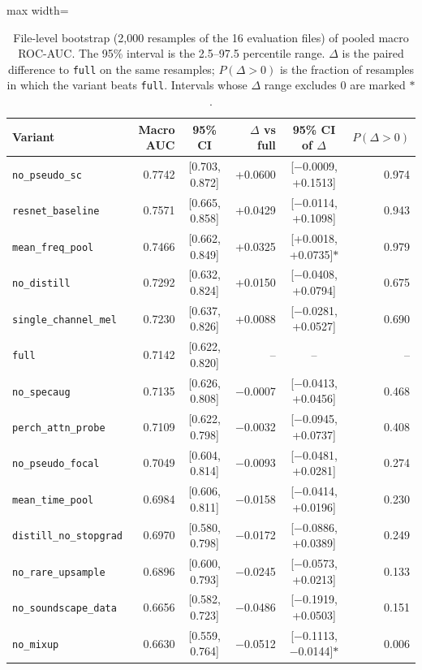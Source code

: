 \begin{table}[H]\centering\small
\caption{File-level bootstrap (2{,}000 resamples of the 16 evaluation files) of pooled macro ROC-AUC. The 95\% interval is the 2.5--97.5 percentile range. $\Delta$ is the paired difference to \texttt{full} on the same resamples; $P(\Delta>0)$ is the fraction of resamples in which the variant beats \texttt{full}. Intervals whose $\Delta$ range excludes 0 are marked $\ast$.}
\label{tab:boot}
\begin{adjustbox}{max width=\linewidth}
\begin{tabular}{lrcrcr}
\toprule
Variant & Macro AUC & 95\% CI & $\Delta$ vs full & 95\% CI of $\Delta$ & $P(\Delta>0)$ \\
\midrule
\texttt{no\_pseudo\_sc} & 0.7742 & [0.703, 0.872] & +0.0600 & [$-$0.0009, +0.1513] & 0.974 \\
\texttt{resnet\_baseline} & 0.7571 & [0.665, 0.858] & +0.0429 & [$-$0.0114, +0.1098] & 0.943 \\
\texttt{mean\_freq\_pool} & 0.7466 & [0.662, 0.849] & +0.0325 & [+0.0018, +0.0735]$\ast$ & 0.979 \\
\texttt{no\_distill} & 0.7292 & [0.632, 0.824] & +0.0150 & [$-$0.0408, +0.0794] & 0.675 \\
\texttt{single\_channel\_mel} & 0.7230 & [0.637, 0.826] & +0.0088 & [$-$0.0281, +0.0527] & 0.690 \\
\texttt{full} & 0.7142 & [0.622, 0.820] & -- & -- & -- \\
\texttt{no\_specaug} & 0.7135 & [0.626, 0.808] & $-$0.0007 & [$-$0.0413, +0.0456] & 0.468 \\
\texttt{perch\_attn\_probe} & 0.7109 & [0.622, 0.798] & $-$0.0032 & [$-$0.0945, +0.0737] & 0.408 \\
\texttt{no\_pseudo\_focal} & 0.7049 & [0.604, 0.814] & $-$0.0093 & [$-$0.0481, +0.0281] & 0.274 \\
\texttt{mean\_time\_pool} & 0.6984 & [0.606, 0.811] & $-$0.0158 & [$-$0.0414, +0.0196] & 0.230 \\
\texttt{distill\_no\_stopgrad} & 0.6970 & [0.580, 0.798] & $-$0.0172 & [$-$0.0886, +0.0389] & 0.249 \\
\texttt{no\_rare\_upsample} & 0.6896 & [0.600, 0.793] & $-$0.0245 & [$-$0.0573, +0.0213] & 0.133 \\
\texttt{no\_soundscape\_data} & 0.6656 & [0.582, 0.723] & $-$0.0486 & [$-$0.1919, +0.0503] & 0.151 \\
\texttt{no\_mixup} & 0.6630 & [0.559, 0.764] & $-$0.0512 & [$-$0.1113, $-$0.0144]$\ast$ & 0.006 \\
\bottomrule
\end{tabular}
\end{adjustbox}
\end{table}
